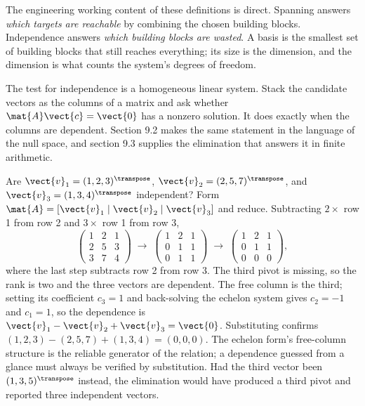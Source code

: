 The engineering working content of these definitions is direct.
Spanning answers \emph{which targets are reachable} by combining the
chosen building blocks. Independence answers \emph{which building
blocks are wasted}. A basis is the smallest set of building blocks
that still reaches everything; its size is the dimension, and the
dimension is what counts the system's degrees of freedom.

The test for independence is a homogeneous linear system. Stack the
candidate vectors as the columns of a matrix and ask whether
$\mat{A}\vect{c} = \vect{0}$ has a nonzero solution. It does exactly
when the columns are dependent. Section 9.2 makes the same statement
in the language of the null space, and section 9.3 supplies the
elimination that answers it in finite arithmetic.

\begin{example}
Are $\vect{v}_{1} = (1, 2, 3)^{\transpose}$, $\vect{v}_{2} = (2, 5,
7)^{\transpose}$, and $\vect{v}_{3} = (1, 3, 4)^{\transpose}$
independent? Form $\mat{A} = [\vect{v}_{1} \mid \vect{v}_{2} \mid
\vect{v}_{3}]$ and reduce. Subtracting $2\times$ row 1 from row 2 and
$3\times$ row 1 from row 3,
\[
\begin{pmatrix} 1 & 2 & 1 \\ 2 & 5 & 3 \\ 3 & 7 & 4 \end{pmatrix}
\;\longrightarrow\;
\begin{pmatrix} 1 & 2 & 1 \\ 0 & 1 & 1 \\ 0 & 1 & 1 \end{pmatrix}
\;\longrightarrow\;
\begin{pmatrix} 1 & 2 & 1 \\ 0 & 1 & 1 \\ 0 & 0 & 0 \end{pmatrix},
\]
where the last step subtracts row 2 from row 3. The third pivot is
missing, so the rank is two and the three vectors are dependent. The
free column is the third; setting its coefficient $c_{3} = 1$ and
back-solving the echelon system gives $c_{2} = -1$ and $c_{1} = 1$,
so the dependence is $\vect{v}_{1} - \vect{v}_{2} + \vect{v}_{3} =
\vect{0}$. Substituting confirms $(1,2,3) - (2,5,7) + (1,3,4) =
(0,0,0)$. The echelon form's free-column structure is the reliable
generator of the relation; a dependence guessed from a glance must
always be verified by substitution. Had the third vector been
$(1,3,5)^{\transpose}$ instead, the elimination would have produced a
third pivot and reported three independent vectors.
\end{example}

